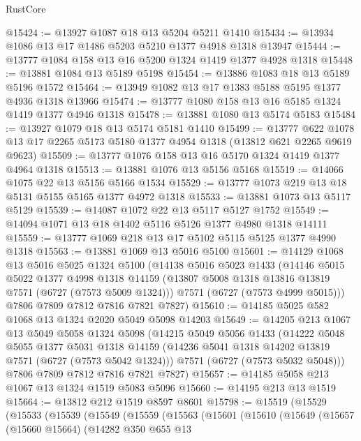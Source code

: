 \begin{lexlean}{RustCore}
\begin{coremodule}
@15424 := @13927 @1087 @18 @13 @5204 @5211 @1410
@15434 := @13934 @1086 @13 @17 @1486 @5203 @5210 @1377 @4918 @1318 @13947
@15444 := @13777 @1084 @158 @13 @16 @5200 @1324 @1419 @1377 @4928 @1318
@15448 := @13881 @1084 @13 @5189 @5198
@15454 := @13886 @1083 @18 @13 @5189 @5196 @1572
@15464 := @13949 @1082 @13 @17 @1383 @5188 @5195 @1377 @4936 @1318 @13966
@15474 := @13777 @1080 @158 @13 @16 @5185 @1324 @1419 @1377 @4946 @1318
@15478 := @13881 @1080 @13 @5174 @5183
@15484 := @13927 @1079 @18 @13 @5174 @5181 @1410
@15499 := @13777
    @622
    @1078
    @13
    @17
    @2265
    @5173
    @5180
    @1377
    @4954
    @1318
    (@13812 @621 @2265 @9619 @9623)
@15509 := @13777 @1076 @158 @13 @16 @5170 @1324 @1419 @1377 @4964 @1318
@15513 := @13881 @1076 @13 @5156 @5168
@15519 := @14066 @1075 @22 @13 @5156 @5166 @1534
@15529 := @13777 @1073 @219 @13 @18 @5131 @5155 @5165 @1377 @4972 @1318
@15533 := @13881 @1073 @13 @5117 @5129
@15539 := @14087 @1072 @22 @13 @5117 @5127 @1752
@15549 := @14094 @1071 @13 @18 @1402 @5116 @5126 @1377 @4980 @1318 @14111
@15559 := @13777 @1069 @218 @13 @17 @5102 @5115 @5125 @1377 @4990 @1318
@15563 := @13881 @1069 @13 @5016 @5100
@15601 := @14129
    @1068
    @13
    @5016
    @5025
    @1324
    @5100
    (@14138
      @5016
      @5023
      @1433
      (@14146
        @5015
        @5022
        @1377
        @4998
        @1318
        @14159
        (@13807 @5008 @1318 @13816 @13819 @7571 (@6727 (@7573 @5009 @1324)))
        @7571
        (@6727 (@7573 @4999 @5015)))
      @7806
      @7809
      @7812
      @7816
      @7821
      @7827)
@15610 := @14185 @5025 @582 @1068 @13 @1324 @2020 @5049 @5098 @14203
@15649 := @14205
    @213
    @1067
    @13
    @5049
    @5058
    @1324
    @5098
    (@14215
      @5049
      @5056
      @1433
      (@14222
        @5048
        @5055
        @1377
        @5031
        @1318
        @14159
        (@14236 @5041 @1318 @14202 @13819 @7571 (@6727 (@7573 @5042 @1324)))
        @7571
        (@6727 (@7573 @5032 @5048)))
      @7806
      @7809
      @7812
      @7816
      @7821
      @7827)
@15657 := @14185 @5058 @213 @1067 @13 @1324 @1519 @5083 @5096
@15660 := @14195 @213 @13 @1519
@15664 := @13812 @212 @1519 @8597 @8601
@15798 := @15519
    (@15529
      (@15533
        (@15539
          (@15549
            (@15559
              (@15563
                (@15601
                  (@15610
                    (@15649
                      (@15657
                        (@15660 @15664)
                        (@14282
                          @350
                          @655
                          @13

\end{coremodule}
\end{lexlean}
